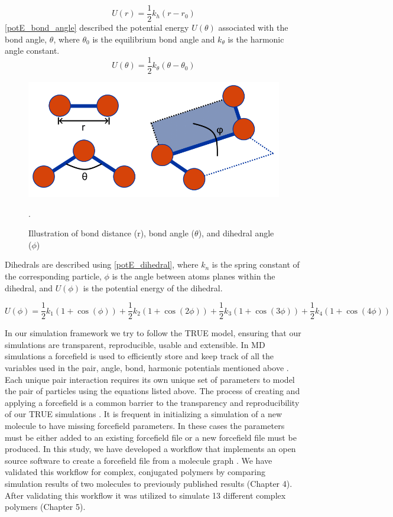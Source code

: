 \begin{equation}
    U(r) = \frac{1}{2} k_{h} \left( r - r_{0} \right)
    \label{potE_bond_distance}
\end{equation}
\autoref{potE_bond_angle} described the potential energy $U(\theta)$ associated with the bond angle, $\theta$, where $\theta_0$ is the equilibrium bond angle and $k_{\theta}$ is the harmonic angle constant. 
\begin{equation}
    U(\theta) = \frac{1}{2} k_{\theta} (\theta - \theta_{0})
    \label{potE_bond_angle}
\end{equation}
\begin{figure}[ht]
    \centering
    \includegraphics[width=0.5\linewidth]{src/figures/intro_figs/dihedral_fig.png}
    \caption{Illustration of bond distance (r), bond angle ($\theta$), and dihedral angle ($\phi$)}.
    \label{forces_fig}
\end{figure}
\par Dihedrals are described using \autoref{potE_dihedral}, where $k_n$ is the spring constant of the corresponding particle, $\phi$ is the angle between atoms planes within the dihedral, and $U(\phi)$ is the potential energy of the dihedral. 

\begin{equation}
    U(\phi) = \frac{1}{2}k_1(1+\cos(\phi)) + \frac{1}{2}k_2(1+\cos(2\phi)) + \frac{1}{2}k_3(1+\cos(3\phi)) + \frac{1}{2}k_4(1+\cos(4\phi))
    \label{potE_dihedral}
\end{equation}

In our simulation framework we try to follow the TRUE model, ensuring that our simulations are transparent, reproducible, usable and extensible. In MD simulations a forcefield is used to efficiently store and keep track of all the variables used in the pair, angle, bond, harmonic potentials mentioned above \citep{ghahremanpour_refinement_2022,gaff}. Each unique pair interaction requires its own unique set of parameters to model the pair of particles using the equations listed above. The process of creating and applying a forcefield is a common barrier to the transparency and reproducibility of our TRUE simulations \citep{jankowski_perspective_2020}. It is frequent in initializing a simulation of a new molecule to have missing forcefield parameters. In these cases the parameters must be either added to an existing forcefield file or a new forcefield file must be produced. In this study, we have developed a workflow that implements an open source software to create a forcefield file from a molecule graph \citep{wang_end--end_2022}. We have validated this workflow for complex, conjugated polymers by comparing simulation results of two molecules to previously published results (Chapter 4). After validating this workflow it was utilized to simulate 13 different complex polymers (Chapter 5).  

